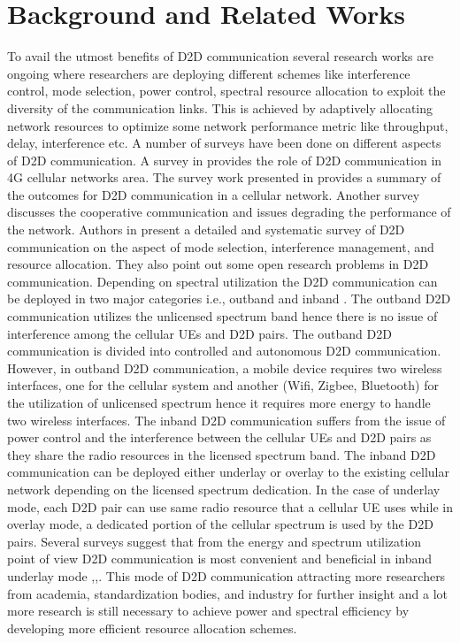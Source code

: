\documentclass[times]{dacauth}
\begin{document}
\section{Background and Related Works}\label{section:Related Work}
\vspace {-0.3cm}
To avail the utmost benefits of D2D communication several research works are ongoing where researchers are deploying different schemes like interference control, mode selection, power control, spectral resource allocation to exploit the diversity of the communication links. This is achieved by adaptively allocating network resources to optimize some network performance metric like throughput, delay, interference etc. A number of surveys have been done on different aspects of D2D communication. A survey in \cite{asadi2014survey} provides the role of D2D communication in 4G cellular networks area. The survey work presented in \cite{liu2015device} provides a summary of the outcomes for D2D communication in a cellular network. Another survey \cite{alkurd2014survey} discusses the cooperative communication and issues degrading the performance of the network. Authors in \cite{ali2016} present a detailed and systematic survey of D2D communication on the aspect of mode selection, interference management, and resource allocation. They also point out some open research problems in D2D communication.
\smallskip
\noindent
Depending on spectral utilization the D2D communication can be deployed in two major categories i.e., outband and inband \cite{ali2016}. The outband D2D communication utilizes the unlicensed spectrum band hence there is no issue of interference among the cellular UEs and D2D pairs. The outband D2D communication is divided into controlled and autonomous D2D communication. However, in outband D2D communication, a mobile device requires two wireless interfaces, one for the cellular system and another (Wifi, Zigbee, Bluetooth) for the utilization of unlicensed spectrum hence it requires more energy to handle two wireless interfaces. The inband D2D communication suffers from the issue of power control and the interference between the cellular UEs and D2D pairs as they share the radio resources in the licensed spectrum band. The inband D2D communication can be deployed either underlay or overlay to the existing cellular network depending on the licensed spectrum dedication. In the case of underlay mode, each D2D pair can use same radio resource that a cellular UE uses while in overlay mode, a dedicated portion of the cellular spectrum is used by the D2D pairs. Several surveys suggest that from the energy and spectrum utilization point of view D2D communication is most convenient and beneficial in inband underlay mode \cite{ali2016},\cite{alkurd2014survey},\cite{asadi2014survey}. This mode of D2D communication attracting more researchers from academia, standardization bodies, and industry for further insight and a lot more research is still necessary to achieve power and spectral efficiency by developing more efficient resource allocation schemes. 
\end{document}
